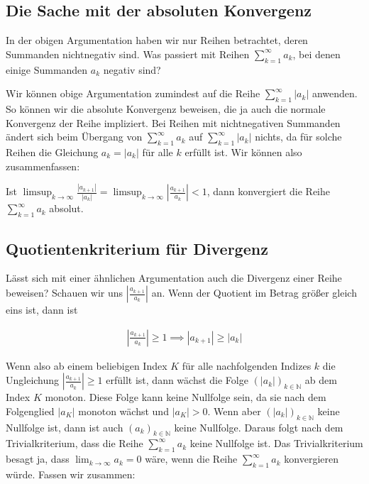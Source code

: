\documentclass[fontsize=9pt,
               parskip=half-,
               DIV=14,
               listof=chapterentry,
               tocflat]{scrbook}
\begin{document}
\subsection{Die Sache mit der absoluten Konvergenz}

In der obigen Argumentation haben wir nur Reihen betrachtet, deren Summanden nichtnegativ sind. Was passiert mit Reihen $\sum _{k=1}^{\infty }a_{k}$, bei denen einige Summanden $a_{k}$ negativ sind?

Wir können obige Argumentation zumindest auf die Reihe $\sum _{k=1}^{\infty }|a_{k}|$ anwenden. So können wir die absolute Konvergenz beweisen, die ja auch die normale Konvergenz der Reihe impliziert. Bei Reihen mit nichtnegativen Summanden ändert sich beim Übergang von $\sum _{k=1}^{\infty }a_{k}$ auf $\sum _{k=1}^{\infty }|a_{k}|$ nichts, da für solche Reihen die Gleichung $a_{k}=|a_{k}|$ für alle $k$ erfüllt ist. Wir können also zusammenfassen:

\begin{importantparagraph*}
Ist $\limsup _{k\to \infty }{\tfrac {|a_{k+1}|}{|a_{k}|}}=\limsup _{k\to \infty }\left|{\tfrac {a_{k+1}}{a_{k}}}\right|<1$, dann konvergiert die Reihe $\sum _{k=1}^{\infty }a_{k}$ absolut.

\end{importantparagraph*}

\subsection{Quotientenkriterium für Divergenz}

Lässt sich mit einer ähnlichen Argumentation auch die Divergenz einer Reihe beweisen? Schauen wir uns $\left|{\tfrac {a_{k+1}}{a_{k}}}\right|$ an. Wenn der Quotient im Betrag größer gleich eins ist, dann ist

\begin{align*}
\left|{\frac {a_{k+1}}{a_{k}}}\right|\geq 1\implies |a_{k+1}|\geq |a_{k}|
\end{align*}

Wenn also ab einem beliebigen Index $K$ für alle nachfolgenden Indizes $k$ die Ungleichung $\left|{\tfrac {a_{k+1}}{a_{k}}}\right|\geq 1$ erfüllt ist, dann wächst die Folge $\left(|a_{k}|\right)_{k\in \mathbb {N} }$ ab dem Index $K$ monoton. Diese Folge kann keine Nullfolge sein, da sie nach dem Folgenglied $|a_{K}|$ monoton wächst und $|a_{K}|>0$. Wenn aber $\left(|a_{k}|\right)_{k\in \mathbb {N} }$ keine Nullfolge ist, dann ist auch $\left(a_{k}\right)_{k\in \mathbb {N} }$ keine Nullfolge. Daraus folgt nach dem Trivialkriterium, dass die Reihe $\sum _{k=1}^{\infty }a_{k}$ keine Nullfolge ist. Das Trivialkriterium besagt ja, dass $\lim _{k\to \infty }a_{k}=0$ wäre, wenn die Reihe $\sum _{k=1}^{\infty }a_{k}$ konvergieren würde. Fassen wir zusammen:
\end{document}
